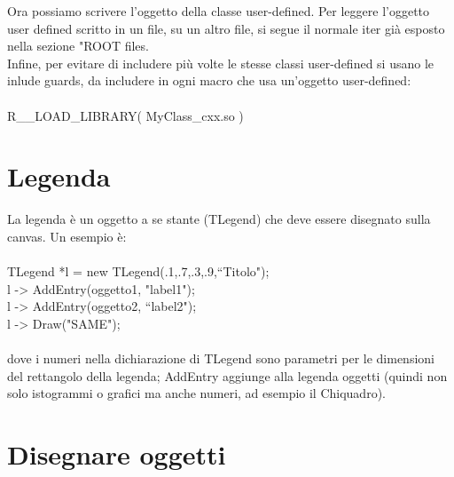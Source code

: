 \documentclass[10pt,a4paper]{article}
\begin{document}
\FloatBarrier
Ora possiamo scrivere l'oggetto della classe user-defined. Per leggere l'oggetto user defined scritto in un file, su un altro file, si segue il normale iter già esposto nella sezione "ROOT files.\\
Infine, per evitare di includere più volte le stesse classi user-defined si usano le inlude guards, da includere in ogni macro che usa un'oggetto user-defined:\\\\
R\_\_LOAD\_LIBRARY( MyClass\_cxx.so )\\
\section{Legenda}
La legenda è un oggetto a se stante (TLegend) che deve essere disegnato sulla canvas. Un esempio è:\\\\
TLegend *l = new TLegend(.1,.7,.3,.9,“Titolo");\\
l -> AddEntry(oggetto1, "label1");\\
l -> AddEntry(oggetto2, “label2");\\
l -> Draw("SAME");\\\\
dove i numeri nella dichiarazione di TLegend sono parametri per le dimensioni del rettangolo della legenda; AddEntry aggiunge alla legenda oggetti (quindi non solo istogrammi o grafici ma anche numeri, ad esempio il Chiquadro). 
\section{Disegnare oggetti}
\end{document}
